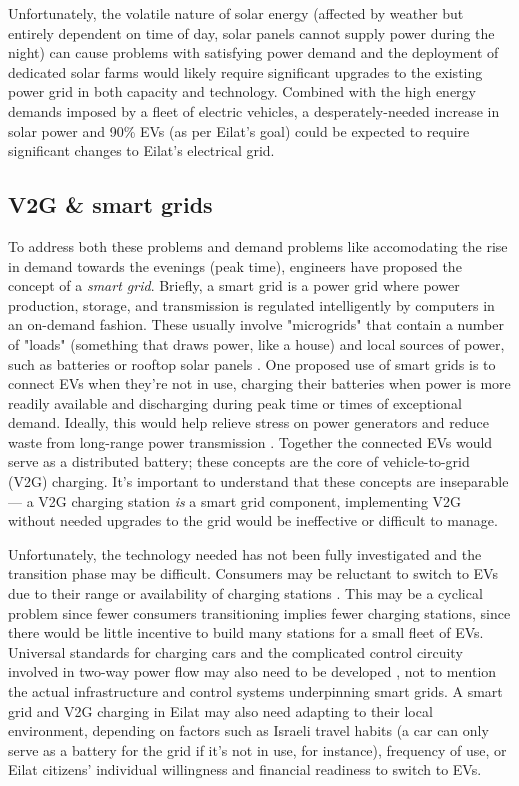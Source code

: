 \documentclass{report}                         %
\begin{document}
Unfortunately, the volatile nature of solar energy (affected by weather but entirely dependent on time of day, solar panels cannot supply power during the night) can cause problems with satisfying power demand \cite{Lu2015IntroductionPEVs} and the deployment of dedicated solar farms would likely require significant upgrades to the existing power grid \cite{Vardimon2011AssessmentIsrael} in both capacity and technology. Combined with the high energy demands imposed by a fleet of electric vehicles, a desperately-needed increase in solar power and 90\% EVs (as per Eilat's goal) could be expected to require significant changes to Eilat's electrical grid.

\subsection{V2G \& smart grids}
To address both these problems and demand problems like accomodating the rise in demand towards the evenings (peak time), engineers have proposed the concept of a \textit{smart grid}. Briefly, a smart grid is a power grid where power production, storage, and transmission is regulated intelligently by computers in an on-demand fashion. These usually involve "microgrids" that contain a number of "loads" (something that draws power, like a house) and local sources of power, such as batteries or rooftop solar panels \cite{Lu2015IntroductionPEVs}. One proposed use of smart grids is to connect EVs when they're not in use, charging their batteries when power is more readily available and discharging during peak time \cite{Mahmud2015PowerEV} or times of exceptional demand. Ideally, this would help relieve stress on power generators and reduce waste from long-range power transmission \cite{Zhu2015DistributedGrid}. Together the connected EVs would serve as a distributed battery; these concepts are the core of vehicle-to-grid (V2G) charging. It's important to understand that these concepts are inseparable --- a V2G charging station \textit{is} a smart grid component, implementing V2G without needed upgrades to the grid would be ineffective or difficult to manage.

Unfortunately, the technology needed has not been fully investigated and the transition phase may be difficult. Consumers may be reluctant to switch to EVs due to their range or availability of charging stations \cite{Zhu2015DistributedGrid}. This may be a cyclical problem since fewer consumers transitioning implies fewer charging stations, since there would be little incentive to build many stations for a small fleet of EVs. Universal standards for charging cars and the complicated control circuity involved in two-way power flow may also need to be developed \cite{Ustun2015ImpactSystems, Yeshayahou2011IsraelCharging}, not to mention the actual infrastructure and control systems underpinning smart grids. A smart grid and V2G charging in Eilat may also need adapting to their local environment, depending on factors such as Israeli travel habits (a car can only serve as a battery for the grid if it's not in use, for instance), frequency of use, or Eilat citizens' individual willingness and financial readiness to switch to EVs.
\end{document}
